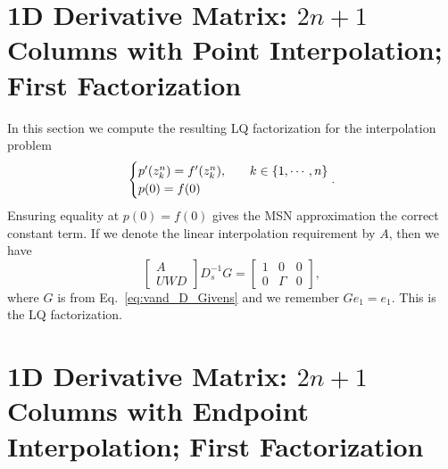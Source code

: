 \section{1D \CV{} Derivative Matrix: $2n+1$ Columns with Point Interpolation;
    First Factorization}
\label{sec:CV_D_1D_2n_E_Point}

In this section we compute the resulting LQ factorization for the
interpolation problem
%
\begin{equation}
    \begin{cases}
        p'(z_{k}^{n}) = f'(z_{k}^{n}), &\quad k\in\left\{ 1,\cdots,n \right\} \\
        p(0) = f(0)
    \end{cases}.
\end{equation}
%
Ensuring equality at $p(0) = f(0)$ gives the MSN approximation the
correct constant term.
If we denote the linear interpolation requirement by $A$, then
we have
%
\begin{equation}
    \begin{bmatrix}
        A \\ UWD \end{bmatrix} D_{s}^{-1}G
     = \begin{bmatrix}
        1 & 0 & 0 \\ 0 & \Gamma & 0 \end{bmatrix},
\end{equation}
%
where $G$ is from Eq.~\eqref{eq:vand_D_Givens}
and we remember $Ge_{1} = e_{1}$.
This is the LQ factorization.




\section{1D \CV{} Derivative Matrix: $2n+1$ Columns with Endpoint Interpolation;
    First Factorization}
\label{sec:CV_D_1D_2n_E_F2}

